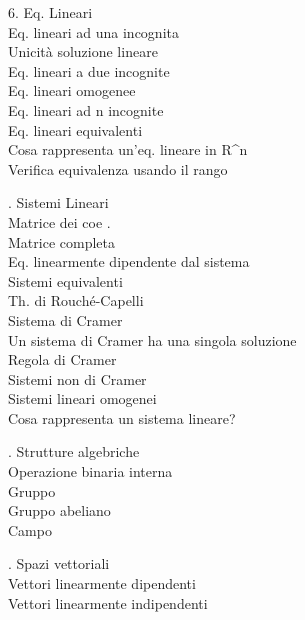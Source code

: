 \documentclass[11pt,a4paper]{article}
\begin{document}
\begin{flushleft}
6. Eq. Lineari\\
\textbullet{}   Eq. lineari ad una incognita\\
\textbullet{}   Unicità soluzione lineare\\
\textbullet{}   Eq. lineari a due incognite\\
\textbullet{}   Eq. lineari omogenee\\
\textbullet{}   Eq. lineari ad n incognite\\
\textbullet{}   Eq. lineari equivalenti\\
\textbullet{}   Cosa rappresenta un’eq. lineare in R\textasciicircum{}n\\
\textbullet{}   Verifica equivalenza usando il rango\\
\par{}. Sistemi Lineari\\
\textbullet{}   Matrice dei coe .\\
\textbullet{}   Matrice completa\\
\textbullet{}   Eq. linearmente dipendente dal sistema\\
\textbullet{}   Sistemi equivalenti\\
\textbullet{}   Th. di Rouché-Capelli\\
\textbullet{}   Sistema di Cramer\\
\textbullet{}   Un sistema di Cramer ha una singola soluzione\\
\textbullet{}   Regola di Cramer\\
\textbullet{}   Sistemi non di Cramer\\
\textbullet{}   Sistemi lineari omogenei\\
\textbullet{}   Cosa rappresenta un sistema lineare?\\
\par{}. Strutture algebriche\\
\textbullet{}   Operazione binaria interna\\
\textbullet{}   Gruppo\\
\textbullet{}   Gruppo abeliano\\
\textbullet{}   Campo\\
\par\smallskip
\par{}. Spazi vettoriali\\
\textbullet{}   Vettori linearmente dipendenti\\
\textbullet{}   Vettori linearmente indipendenti\\

\end{flushleft}
\end{document}
